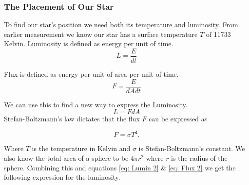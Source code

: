 \documentclass[reprint,english,notitlepage]{revtex4-2}
\begin{document}
\subsubsection*{The Placement of Our Star}
To find our star's position we need both its temperature and luminosity. From earlier measurement we know our star has a surface temperature $ T $ of 11733 Kelvin. Luminosity is defined as energy per unit of time. 
\begin{equation} \label{eq: Luminosity}
  L = \frac{E}{dt}
\end{equation}  

Flux is defined as energy per unit of area per unit of time. 
\begin{equation} \label{eq: Flux}
  F = \frac{E}{dAdt}
\end{equation}

We can use this to find a new way to express the Luminosity. 
\begin{equation} \label{eq: Lumin 2}
  L = FdA 
\end{equation}
Stefan-Boltzmann's law%
dictates that the flux $ F $ can be expressed as

\begin{equation}\label{eq: Flux 2}
  F = σT^{4}.
\end{equation}

Where $ T $ is the temperature in Kelvin and $ \sigma  $ is Stefan-Boltzmann's constant. We also know the total area of a sphere to be $ 4 \pi r^{2} $  where $ r $ is the radius of the sphere. Combining this and equations \ref{eq: Lumin 2} \& \ref{eq: Flux 2} we get the following expression for the luminosity.
\end{document}
